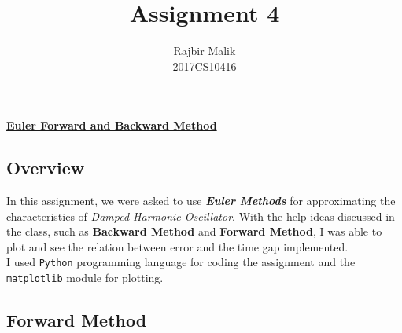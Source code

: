 \documentclass{article}
\title{Assignment 4}
\author{Rajbir Malik \\ 2017CS10416}
\begin{document}
    
    \maketitle
    
    \begin{center}
    \Large{\underline{\textbf{Euler Forward and Backward Method}}}
    \end{center}
    \subsection*{Overview}
    In this assignment, we were asked to use \textbf{\emph{Euler Methods}} for approximating the characteristics of \textit{Damped Harmonic Oscillator}. With the help ideas discussed in the class, such as \textbf{Backward Method} and \textbf{Forward Method}, I was able to plot and see the relation between error and the time gap implemented.\\I used \texttt{Python} programming language for coding the assignment and the \texttt{matplotlib} module for plotting.
    
    \pagebreak
    \subsection*{Forward Method}
    
\end{document}
